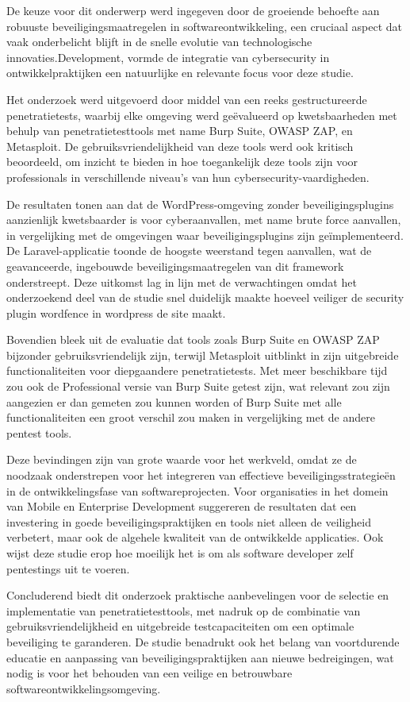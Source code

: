 De keuze voor dit onderwerp werd ingegeven door de groeiende behoefte aan robuuste beveiligingsmaatregelen in softwareontwikkeling, een cruciaal 
aspect dat vaak onderbelicht blijft in de snelle evolutie van technologische innovaties.Development, vormde de integratie van cybersecurity in 
ontwikkelpraktijken een natuurlijke en relevante focus voor deze studie.

Het onderzoek werd uitgevoerd door middel van een reeks gestructureerde penetratietests, waarbij elke omgeving werd geëvalueerd op 
kwetsbaarheden met behulp van penetratietesttools met name Burp Suite, OWASP ZAP, en Metasploit. De gebruiksvriendelijkheid 
van deze tools werd ook kritisch beoordeeld, om inzicht te bieden in hoe toegankelijk deze tools zijn voor professionals in verschillende 
niveau's van hun cybersecurity-vaardigheden.

De resultaten tonen aan dat de WordPress-omgeving zonder beveiligingsplugins aanzienlijk kwetsbaarder is voor cyberaanvallen, met name 
brute force aanvallen, in vergelijking met de omgevingen waar beveiligingsplugins zijn geïmplementeerd. De Laravel-applicatie toonde 
de hoogste weerstand tegen aanvallen, wat de geavanceerde, ingebouwde beveiligingsmaatregelen van dit framework onderstreept.
Deze uitkomst lag in lijn met de verwachtingen omdat het onderzoekend deel van de studie snel duidelijk maakte hoeveel veiliger 
de security plugin wordfence in wordpress de site maakt.

Bovendien bleek uit de evaluatie dat tools zoals Burp Suite en OWASP ZAP bijzonder gebruiksvriendelijk zijn, terwijl Metasploit 
uitblinkt in zijn uitgebreide functionaliteiten voor diepgaandere penetratietests. Met meer beschikbare tijd zou ook 
de Professional versie van Burp Suite getest zijn, wat relevant zou zijn aangezien er dan gemeten zou kunnen worden of Burp 
Suite met alle functionaliteiten een groot verschil zou maken in vergelijking met de andere pentest tools.

Deze bevindingen zijn van grote waarde voor het werkveld, omdat ze de noodzaak onderstrepen voor het integreren van effectieve 
beveiligingsstrategieën in de ontwikkelingsfase van softwareprojecten. Voor organisaties in het domein van Mobile en Enterprise 
Development suggereren de resultaten dat een investering in goede beveiligingspraktijken en tools niet alleen de veiligheid 
verbetert, maar ook de algehele kwaliteit van de ontwikkelde applicaties. Ook wijst deze studie erop hoe moeilijk het 
is om als software developer zelf pentestings uit te voeren.

Concluderend biedt dit onderzoek praktische aanbevelingen voor de selectie en implementatie van penetratietesttools, met 
nadruk op de combinatie van gebruiksvriendelijkheid en uitgebreide testcapaciteiten om een optimale beveiliging te 
garanderen. De studie benadrukt ook het belang van voortdurende educatie en aanpassing van beveiligingspraktijken aan nieuwe 
bedreigingen, wat nodig is voor het behouden van een veilige en betrouwbare softwareontwikkelingsomgeving.

